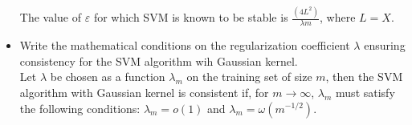 \begin{itemize}
        The value of $\varepsilon$ for which SVM is known to be stable is $\frac{(4L^2)}{\lambda m}$, where $L = X$.\\       

    \item Write the mathematical conditions on the regularization coefficient $\lambda$ ensuring consistency for the SVM algorithm wih Gaussian kernel.\\

       Let $\lambda$ be chosen as a function $\lambda_m$ on the training set of size $m$, then the SVM algorithm with Gaussian kernel is consistent if, for $m \rightarrow \infty$, $\lambda_m$ must satisfy the following conditions: $\lambda_m = o(1)$ and $\lambda_m = \omega (m^{-1/2})$.

\end{itemize}
